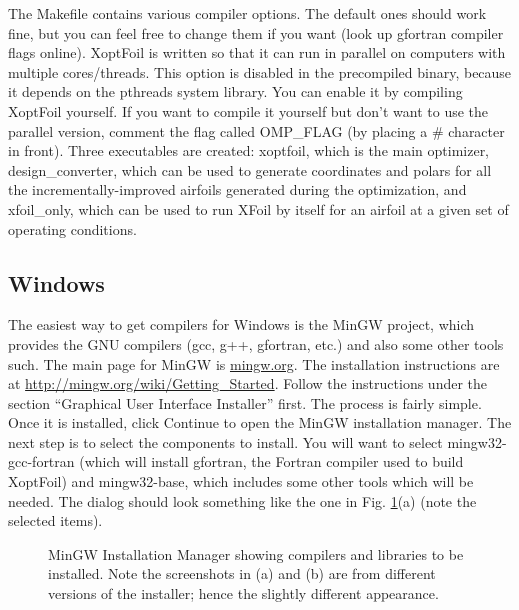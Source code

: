 \documentclass[11pt]{article}
\begin{document}
The Makefile contains various compiler options.  The default ones should work fine, but
you can feel free to change them if you want (look up gfortran compiler flags online).
XoptFoil is written so that it can run in parallel on computers with multiple
cores/threads.  This option is disabled in the precompiled binary, because it depends on
the pthreads system library.  You can enable it by compiling XoptFoil yourself.  If you
want to compile it yourself but don't want to use the parallel version, comment the flag
called OMP\_FLAG (by placing a \# character in front). Three executables are
created: xoptfoil, which is the main optimizer, design\_converter, which can be used
to generate coordinates and polars for all the incrementally-improved airfoils generated
during the optimization, and xfoil\_only, which can be used to run XFoil by itself for
an airfoil at a given set of operating conditions.

\subsection{Windows}\label{sec:compile_windows}

The easiest way to get compilers for Windows is the MinGW project, which provides the GNU
compilers (gcc, g++, gfortran, etc.) and also some other tools such.  The main page for
MinGW is \url{mingw.org}.  The installation instructions are at
\url{http://mingw.org/wiki/Getting_Started}.  Follow the instructions under the section
``Graphical User Interface Installer'' first.  The process is fairly simple.  Once it is
installed, click Continue to open the MinGW installation manager.  The next step is to
select the components to install.  You will want to select mingw32-gcc-fortran 
(which will install gfortran, the Fortran
compiler used to build XoptFoil) and mingw32-base, which includes some other tools
which will be needed.  The dialog should look something like the one in Fig.
\ref{fig:installmingw1}(a) (note the selected items).

\begin{figure}[!h]
\centering

   \caption{MinGW Installation Manager showing compilers and libraries to be installed.
Note the screenshots in (a) and (b) are from different versions of the installer; hence
the slightly different appearance.}
\label{fig:installmingw1}
\end{figure}
\end{document}

